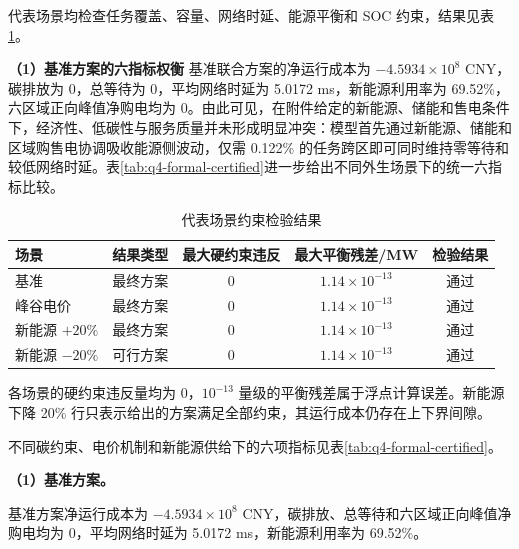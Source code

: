 代表场景均检查任务覆盖、容量、网络时延、能源平衡和 SOC 约束，结果见表\ref{tab:q4-constraint-audit}。

\noindent\textbf{（1）基准方案的六指标权衡}
基准联合方案的净运行成本为 $-4.5934\times10^8$ CNY，碳排放为 0，总等待为 0，平均网络时延为 5.0172 ms，新能源利用率为 69.52\%，六区域正向峰值净购电均为 0。由此可见，在附件给定的新能源、储能和售电条件下，经济性、低碳性与服务质量并未形成明显冲突：模型首先通过新能源、储能和区域购售电协调吸收能源侧波动，仅需 0.122\% 的任务跨区即可同时维持零等待和较低网络时延。表\ref{tab:q4-formal-certified}进一步给出不同外生场景下的统一六指标比较。

\begingroup
{}
\begin{table}[!htbp]
\centering
\caption{代表场景约束检验结果}
\label{tab:q4-constraint-audit}
\small
\begin{tabular}{lcccc}
\toprule
\rowcolor{CumcmLightBlue}
场景 & 结果类型 & 最大硬约束违反 & 最大平衡残差/MW & 检验结果 \\
\midrule
基准 & 最终方案 & 0 & $1.14\times10^{-13}$ & 通过 \\
峰谷电价 & 最终方案 & 0 & $1.14\times10^{-13}$ & 通过 \\
新能源 $+20\%$ & 最终方案 & 0 & $1.14\times10^{-13}$ & 通过 \\
新能源 $-20\%$ & 可行方案 & 0 & $1.14\times10^{-13}$ & 通过 \\
\bottomrule
\end{tabular}
\end{table}

各场景的硬约束违反量均为 0，$10^{-13}$ 量级的平衡残差属于浮点计算误差。新能源下降 20\% 行只表示给出的方案满足全部约束，其运行成本仍存在上下界间隙。

不同碳约束、电价机制和新能源供给下的六项指标见表\ref{tab:q4-formal-certified}。

\noindent\textbf{（1）基准方案。}\par
基准方案净运行成本为 $-4.5934\times10^8$ CNY，碳排放、总等待和六区域正向峰值净购电均为 0，平均网络时延为 5.0172 ms，新能源利用率为 69.52\%。

